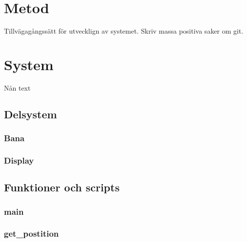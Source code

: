 \section{Metod}
Tillvägagångssätt för utvecklign av systemet. Skriv massa positiva saker om git.
\section{System}
 Nån text
	\subsection{Delsystem}
		\subsubsection{Bana}
		\subsubsection{Display}
	\subsection{Funktioner och scripts}
		\subsubsection{main}
		\subsubsection{get\_postition}
